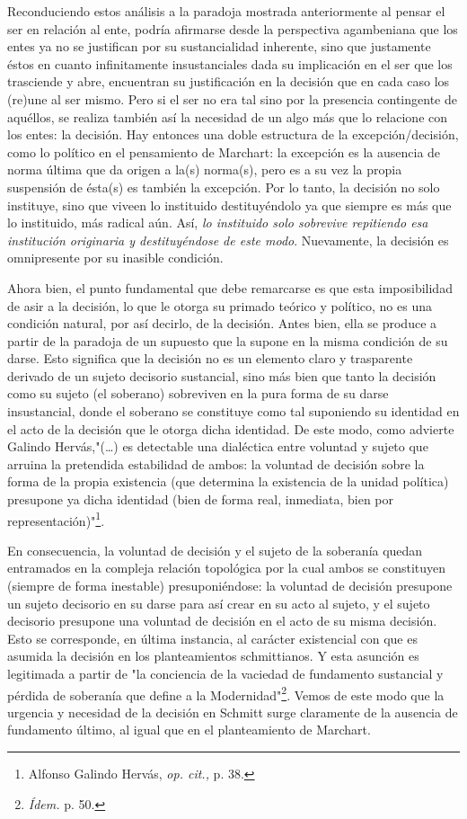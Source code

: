 \documentclass{book}
\begin{document}
Reconduciendo estos análisis a la paradoja mostrada anteriormente al
pensar el ser en relación al ente, podría afirmarse desde la perspectiva
agambeniana que los entes ya no se justifican por su sustancialidad
inherente, sino que justamente éstos en cuanto infinitamente
insustanciales dada su implicación en el ser que los trasciende y abre,
encuentran su justificación en la decisión que en cada caso los (re)une
al ser mismo. Pero si el ser no era tal sino por la presencia
contingente de aquéllos, se realiza también así la necesidad de un algo
más que lo relacione con los entes: la decisión. Hay entonces una doble
estructura de la excepción/decisión, como lo político en el pensamiento
de Marchart: la excepción es la ausencia de norma última que da origen a
la(s) norma(s), pero es a su vez la propia suspensión de ésta(s) es
también la excepción. Por lo tanto, la decisión no solo instituye, sino
que viveen lo instituido destituyéndolo ya que siempre es más que lo
instituido, más radical aún. Así, \emph{lo instituido solo sobrevive
repitiendo esa institución originaria y destituyéndose de este modo}.
Nuevamente, la decisión es omnipresente por su inasible condición.

Ahora bien, el punto fundamental que debe remarcarse es que esta
imposibilidad de asir a la decisión, lo que le otorga su primado teórico
y político, no es una condición natural, por así decirlo, de la
decisión. Antes bien, ella se produce a partir de la paradoja de un
supuesto que la supone en la misma condición de su darse. Esto significa
que la decisión no es un elemento claro y trasparente derivado de un
sujeto decisorio sustancial, sino más bien que tanto la decisión como su
sujeto (el soberano) sobreviven en la pura forma de su darse
insustancial, donde el soberano se constituye como tal suponiendo su
identidad en el acto de la decisión que le otorga dicha identidad. De
este modo, como advierte Galindo Hervás,"(\dots) es detectable una
dialéctica entre voluntad y sujeto que arruina la pretendida estabilidad
de ambos: la voluntad de decisión sobre la forma de la propia existencia
(que determina la existencia de la unidad política) presupone ya dicha
identidad (bien de forma real, inmediata, bien por
representación)"\footnote{Alfonso Galindo Hervás, \emph{op. cit.,} p.
  38.}.

En consecuencia, la voluntad de decisión y el sujeto de la soberanía
quedan entramados en la compleja relación topológica por la cual ambos
se constituyen (siempre de forma inestable) presuponiéndose: la voluntad
de decisión presupone un sujeto decisorio en su darse para así crear en
su acto al sujeto, y el sujeto decisorio presupone una voluntad de
decisión en el acto de su misma decisión. Esto se corresponde, en última
instancia, al carácter existencial con que es asumida la decisión en los
planteamientos schmittianos. Y esta asunción es legitimada a partir de
"la conciencia de la vaciedad de fundamento sustancial y pérdida de
soberanía que define a la Modernidad"\footnote{\emph{Ídem.} p. 50.}.
Vemos de este modo que la urgencia y necesidad de la decisión en Schmitt
surge claramente de la ausencia de fundamento último, al igual que en el
planteamiento de Marchart.
\end{document}
